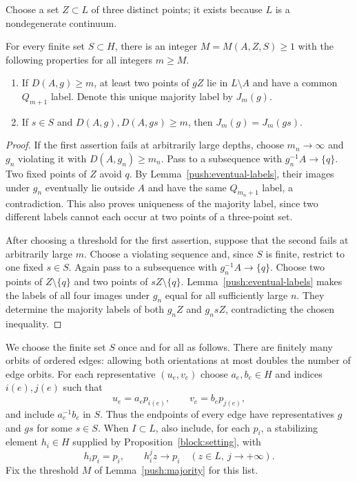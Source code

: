 Choose a set $Z\subset L$ of three distinct points; it exists because
$L$ is a nondegenerate continuum.

\begin{lemma}\label{push:majority}
For every finite set $S\subset H$, there is an integer $M=M(A,Z,S)\ge1$ with the
following properties for all integers $m\ge M$.
\begin{enumerate}
\item If $D(A,g)\ge m$, at least two points of $gZ$ lie in
$L\setminus A$ and have a common $Q_{m+1}$ label.  Denote this unique
majority label by $J_m(g)$.
\item If $s\in S$ and $D(A,g),D(A,gs)\ge m$, then
$J_m(g)=J_m(gs)$.
\end{enumerate}
\end{lemma}
\begin{proof}
If the first assertion fails at arbitrarily large depths, choose
$m_n\to\infty$ and $g_n$ violating it with $D(A,g_n)\ge m_n$.
Pass to a subsequence with $g_n^{-1}A\to\{q\}$.
Two fixed points of $Z$ avoid $q$.
By Lemma~\ref{push:eventual-labels}, their images under $g_n$ eventually
lie outside $A$ and have the same $Q_{m_n+1}$ label, a contradiction.
This also proves uniqueness of the majority label, since two different
labels cannot each occur at two points of a three-point set.

After choosing a threshold for the first assertion, suppose that the
second fails at arbitrarily large $m$.
Choose a violating sequence and, since $S$ is finite, restrict to one
fixed $s\in S$.
Again pass to a subsequence with $g_n^{-1}A\to\{q\}$.
Choose two points of $Z\setminus\{q\}$ and two points of
$sZ\setminus\{q\}$.
Lemma~\ref{push:eventual-labels} makes the labels of all four images
under $g_n$ equal for all sufficiently large $n$.
They determine the majority labels of both $g_nZ$ and $g_nsZ$,
contradicting the chosen inequality.
\end{proof}

We choose the finite set $S$ once and for all as follows.
There are finitely many orbits of ordered edges: allowing both
orientations at most doubles the number of edge orbits.
For each representative $(u_e,v_e)$ choose $a_e,b_e\in H$ and indices
$i(e),j(e)$ such that
\[
 u_e=a_ep_{i(e)},\qquad v_e=b_ep_{j(e)},
\]
and include $a_e^{-1}b_e$ in $S$.
Thus the endpoints of every edge have representatives $g$ and $gs$
for some $s\in S$.
When $I\subset L$, also include, for each $p_i$, a stabilizing element
$h_i\in H$ supplied by Proposition~\ref{block:setting}, with
\[
 h_i p_i=p_i,\qquad h_i^j z\longrightarrow p_i
 \quad(z\in L,\ j\longrightarrow+\infty).
\]
Fix the threshold $M$ of Lemma~\ref{push:majority} for this list.

